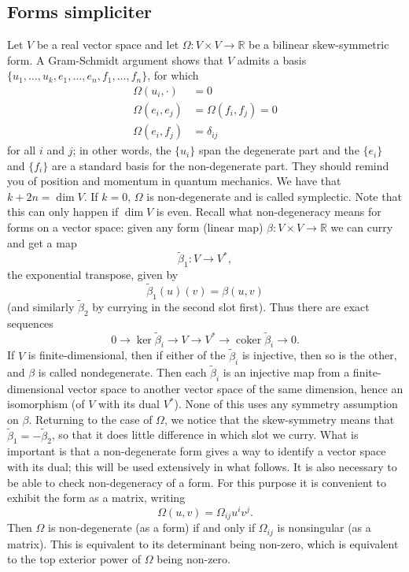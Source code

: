 \documentclass[11pt]{article} %
\begin{document}
\subsection*{Forms simpliciter}
Let $V$ be a real vector space and let $\Omega: V\times V \rightarrow \mathbb{R}$ be a bilinear skew-symmetric form. A Gram-Schmidt argument shows that $V$ admits a basis $\{u_1, \dots, u_k, e_1, \dots, e_n, f_1, \dots, f_n\}$, for which
\begin{align*}
 \Omega(u_i, \cdot)  &= 0  \\
 \Omega(e_i, e_j) &= \Omega(f_i, f_j) = 0 \\
\Omega(e_i, f_j) &= \delta_{ij}
\end{align*}
for all $i$ and $j$; in other words, the $\{u_i\}$ span the degenerate part and the $\{e_i\}$ and $\{f_i\}$ are a standard basis for the non-degenerate part. They should remind you of position and momentum in quantum mechanics. We have that $k + 2n = \operatorname{dim}V$. If $k=0$, $\Omega$ is non-degenerate and is called symplectic. Note that this can only happen if $ \operatorname{dim}V$ is even. Recall what non-degeneracy means for forms on a vector space: given any form (linear map) $\beta: V\times V \rightarrow \mathbb{R}$ we can curry and get a map
$$
\tilde{\beta}_1: V \rightarrow V^\ast,
$$
the exponential transpose, given by
$$
\tilde{\beta}_1(u)(v) = \beta(u,v)
$$
(and similarly $\tilde{\beta}_2$ by currying in the second slot first). Thus there are exact sequences
$$
0 \rightarrow \operatorname{ker}\tilde{\beta}_i \rightarrow V \rightarrow V^\ast \rightarrow \operatorname{coker}\tilde{\beta}_i \rightarrow 0.
$$
If $V$ is finite-dimensional, then if either of the $\tilde{\beta}_i$ is injective, then so is the other, and $\beta$ is called nondegenerate. Then each $\tilde{\beta}_i$ is an injective map from a finite-dimensional vector space to another vector space of the same dimension, hence an isomorphism (of $V$ with its dual $V^\ast$). None of this uses any symmetry assumption on $\beta$. Returning to the case of $\Omega$, we notice that the skew-symmetry means that $\tilde{\beta}_1 = - \tilde{\beta}_2$, so that it does little difference in which slot we curry. What is important is that a non-degenerate form gives a way to identify a vector space with its dual; this will be used extensively in what follows. It is also necessary to be able to check non-degeneracy of a form. For this purpose it is convenient to exhibit the form as a matrix, writing
$$
\Omega(u,v) = \Omega_{ij}u^i v^j.
$$
Then $\Omega$ is non-degenerate (as a form) if and only if $\Omega_{ij}$ is nonsingular (as a matrix). This is equivalent to its determinant being non-zero, which is equivalent to the top exterior power of $\Omega$ being non-zero. 
\end{document}
